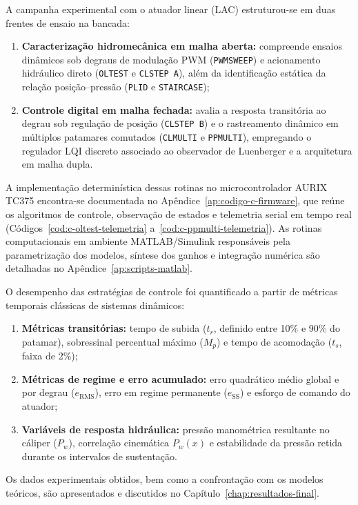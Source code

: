 A campanha experimental com o atuador linear (\gls{LAC}) estruturou-se em duas frentes de ensaio na bancada:
\begin{enumerate}
    \item \textbf{Caracterização hidromecânica em malha aberta:} compreende ensaios dinâmicos sob degraus de modulação \gls{PWM} (\texttt{PWMSWEEP}) e acionamento hidráulico direto (\texttt{OLTEST} e \texttt{CLSTEP A}), além da identificação estática da relação posição--pressão (\texttt{PLID} e \texttt{STAIRCASE});
    \item \textbf{Controle digital em malha fechada:} avalia a resposta transitória ao degrau sob regulação de posição (\texttt{CLSTEP B}) e o rastreamento dinâmico em múltiplos patamares comutados (\texttt{CLMULTI} e \texttt{PPMULTI}), empregando o regulador LQI discreto associado ao observador de Luenberger e a arquitetura em malha dupla.
\end{enumerate}

A implementação determinística dessas rotinas no microcontrolador AURIX TC375 encontra-se documentada no Apêndice~\ref{ap:codigo-c-firmware}, que reúne os algoritmos de controle, observação de estados e telemetria serial em tempo real (Códigos~\ref{cod:c-oltest-telemetria} a~\ref{cod:c-ppmulti-telemetria}). As rotinas computacionais em ambiente MATLAB/Simulink responsáveis pela parametrização dos modelos, síntese dos ganhos e integração numérica são detalhadas no Apêndice~\ref{ap:scripts-matlab}.

O desempenho das estratégias de controle foi quantificado a partir de métricas temporais clássicas de sistemas dinâmicos:
\begin{enumerate}
    \item \textbf{Métricas transitórias:} tempo de subida ($t_r$, definido entre 10\% e 90\% do patamar), sobressinal percentual máximo ($M_p$) e tempo de acomodação ($t_s$, faixa de 2\%);
    \item \textbf{Métricas de regime e erro acumulado:} erro quadrático médio global e por degrau ($e_{\mathrm{RMS}}$), erro em regime permanente ($e_{\mathrm{SS}}$) e esforço de comando do atuador;
    \item \textbf{Variáveis de resposta hidráulica:} pressão manométrica resultante no cáliper ($P_w$), correlação cinemática $P_w(x)$ e estabilidade da pressão retida durante os intervalos de sustentação.
\end{enumerate}
Os dados experimentais obtidos, bem como a confrontação com os modelos teóricos, são apresentados e discutidos no Capítulo~\ref{chap:resultados-final}.

